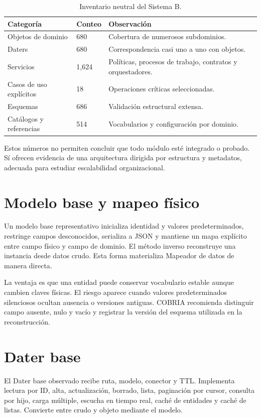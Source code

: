 \begin{table}[H]
\centering
\caption{Inventario neutral del Sistema B.}
\label{tab:inventario-sistema-b}
\begin{tabularx}{\textwidth}{p{3.5cm}p{2.2cm}X}
\toprule
Categoría & Conteo & Observación \\
\midrule
Objetos de dominio & 680 & Cobertura de numerosos subdominios.\\
Daters & 680 & Correspondencia casi uno a uno con objetos.\\
Servicios & 1,624 & Políticas, procesos de trabajo, contratos y orquestadores.\\
Casos de uso explícitos & 18 & Operaciones críticas seleccionadas.\\
Esquemas & 686 & Validación estructural extensa.\\
Catálogos y referencias & 514 & Vocabularios y configuración por dominio.\\
\bottomrule
\end{tabularx}
\end{table}

Estos números no permiten concluir que todo módulo esté integrado o probado. Sí ofrecen
evidencia de una arquitectura dirigida por estructura y metadatos, adecuada para estudiar
escalabilidad organizacional.

\section{Modelo base y mapeo físico}

Un modelo base representativo inicializa identidad y valores predeterminados, restringe campos
desconocidos, serializa a JSON y mantiene un mapa explícito entre campo físico y campo de
dominio. El método inverso reconstruye una instancia desde datos crudo. Esta forma
materializa Mapeador de datos de manera directa.

La ventaja es que una entidad puede conservar vocabulario estable aunque cambien claves
físicas. El riesgo aparece cuando valores predeterminados silenciosos ocultan ausencia o versiones
antiguas. COBRIA recomienda distinguir campo ausente, nulo y vacío y registrar la versión
del esquema utilizada en la reconstrucción.

\section{Dater base}

El Dater base observado recibe ruta, modelo, conector y TTL. Implementa lectura por ID,
alta, actualización, borrado, lista, paginación por cursor, consulta por hijo, carga
múltiple, escucha en tiempo real, caché de entidades y caché de listas. Convierte entre
crudo y objeto mediante el modelo.

